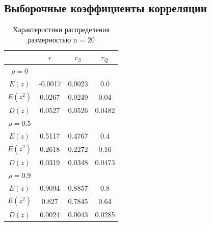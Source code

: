 \documentclass[../main.tex]{subfiles}
\begin{document}
    \subsection {Выборочные коэффициенты корреляции}
    \begin{table}[H]
        \centering
        \begin{tabular}{|c|c|c|c|}
            \hline
            & $r$ & $r_S$ & $r_Q$\\\hline
            $\rho=0$ & & &\\\hline
            $E(z)$ & -0.0017 & 0.0023 & 0.0\\\hline
            $E(z^2)$ & 0.0267 & 0.0249 & 0.04\\\hline
            $D(z)$ & 0.0527 & 0.0526 & 0.0482\\\hline
            \hline
            $\rho=0.5$ & & &\\\hline
            $E(z)$ & 0.5117 & 0.4767 & 0.4\\\hline
            $E(z^2)$ & 0.2618 & 0.2272 & 0.16\\\hline
            $D(z)$ & 0.0319 & 0.0348 & 0.0473\\\hline
            \hline
            $\rho=0.9$ & & &\\\hline
            $E(z)$ & 0.9094 & 0.8857 & 0.8\\\hline
            $E(z^2)$ & 0.827 & 0.7845 & 0.64\\\hline
            $D(z)$ & 0.0024 & 0.0043 & 0.0285\\\hline
        \end{tabular}
        \caption{Характеристики распределения размерностью n = 20}
    \end{table}
    
\end{document}
